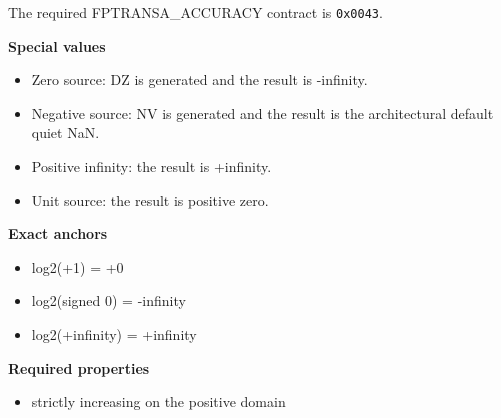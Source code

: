 The required FPTRANSA\_ACCURACY contract is \texttt{0x0043}.

\textbf{Special values}\par
\begin{itemize}
\item Zero source: DZ is generated and the result is -infinity.
\item Negative source: NV is generated and the result is the architectural default quiet NaN.
\item Positive infinity: the result is +infinity.
\item Unit source: the result is positive zero.
\end{itemize}

\textbf{Exact anchors}\par
\begin{itemize}
\item log2(+1) = +0
\item log2(signed 0) = -infinity
\item log2(+infinity) = +infinity
\end{itemize}

\textbf{Required properties}\par
\begin{itemize}
\item strictly increasing on the positive domain
\end{itemize}
